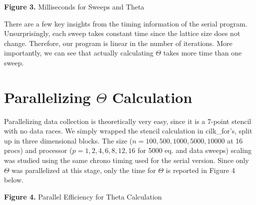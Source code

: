 \documentclass{article}
\begin{document}
\begin{center}
\textbf{Figure 3.} Milliseconds for Sweeps and Theta\\
\end{center}

\indent There are a few key insights from the timing information of the serial program. Unsurprisingly, each sweep takes constant time since the lattice size does not change. Therefore, our program is linear in the number of iterations. More importantly, we can see that actually calculating $\Theta$ takes more time than one sweep.

\section*{Parallelizing $\Theta$ Calculation}
\vspace{-7pt}
\indent\indent Parallelizing data collection is theoretically very easy, since it is a 7-point stencil with no data races. We simply wrapped the stencil calculation in cilk\_for's, split up in three dimensional blocks. The size ($n=100,500,1000,5000,10000$ at 16 procs) and processor ($p=1,2,4,6,8,12,16$ for 5000 eq. and data sweeps) scaling was studied using the same chrono timing used for the serial version. Since only $\Theta$ was parallelized at this stage, only the time for $\Theta$ is reported in Figure 4 below.

\newpage

\begin{center}
\textbf{Figure 4.} Parallel Efficiency for Theta Calculation\\
\end{center}
\end{document}
